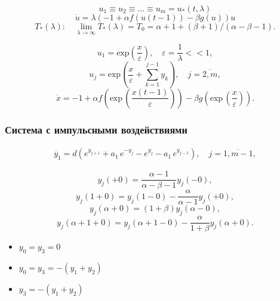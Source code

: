 \documentclass[fullscreen=true, unicode, bookmarks=false]{beamer}
\begin{document}
\begin{frame}

$$ u_1 \equiv u_2 \equiv \ldots \equiv u_m = u_*(t, \lambda) $$
$$ \dot{u} = \lambda(-1+\alpha f(u(t-1)) - \beta g(u))u $$
$$ T_*(\lambda): \quad \lim_{\lambda\to\infty} T_*(\lambda) = T_0 = \alpha + 1 + (\beta+1)/(\alpha - \beta - 1). $$

\vfill

$$ u_1 = \mbox{exp} \left( \frac{x}{\varepsilon} \right), \quad \varepsilon = \frac{1}{\lambda} << 1, $$
$$ u_j = \mbox{exp} \left( \frac{x}{\varepsilon} + \sum\limits_{k=1}^{j-1} y_k \right), \quad j = \overline{2,m}, $$ 
$$ \dot{x} = -1 + \alpha f \left( \mbox{exp} \, \left( \frac{x(t-1)}{\varepsilon} \right) \right) - \beta g \left( \mbox{exp} \, \left( \frac{x}{\varepsilon} \right) \right). $$

\end{frame}

\begin{frame}
\frametitle{Система с импульсными воздействиями} 

\begin{eqnarray}\label{y_system}
\dot{y_1} = d(e^{y_{j+1}} + a_1\,e^{-y_j} - e^{y_j} - a_1\,e^{y_{j-1}}), \quad  j=\overline{1,m-1},
\end{eqnarray}

$$ y_j(+0) = \frac{\alpha -1}{\alpha - \beta - 1}y_j(-0), $$
$$ y_j(1+0) = y_j(1-0) - \frac{\alpha}{\alpha - 1}y_j(+0), $$
$$ y_j(\alpha + 0) = (1 + \beta)y_j(\alpha - 0), $$
$$ y_j(\alpha + 1 + 0) = y_j(\alpha + 1 - 0) - \frac{\alpha}{1 + \beta}y_j(\alpha + 0). $$

\begin{itemize}
\item { $ y_0 = y_3 = 0 $ }
\item { $ y_0 = y_3 = -(y_1 + y_2) $ }
\item { $ y_3 = -(y_1 + y_2) $ }
\end{itemize}

\end{frame}
\end{document}
